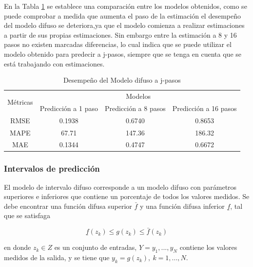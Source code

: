 \documentclass[12pt]{article}
\begin{document}
En la Tabla \ref{t_MDjp} se establece una comparación entre los modelos obtenidos, como se puede comprobar a medida que aumenta el paso de la estimación el desempeño del modelo difuso se deteriora,ya que el modelo comienza a realizar estimaciones a partir de sus propias estimaciones. Sin embargo entre la estimación a 8 y 16 pasos no existen marcadas diferencias, lo cual indica que se puede utilizar el modelo obtenido para predecir a j-pasos, siempre que se tenga en cuenta que se está trabajando con estimaciones.

\begin{table}[htbp]
  \centering
  \caption{Desempeño del Modelo difuso a j-pasos}
\begin{tabular}{|c|c|c|c|}
	\hline
	\multirow{2}{*}{Métricas} & \multicolumn{3}{c|}{Modelos}                                     \\ \cline{2-4}
	& Predicción a 1 paso & Predicción a 8 pasos & Predicción a 16 pasos \\ \hline
	RMSE                      & 0.1938              & 0.6740              & 0.8653               \\ \hline
	MAPE                      & 67.71               & 147.36              & 186.32               \\ \hline
	MAE                       & 0.1344              & 0.4747              & 0.6672               \\ \hline
\end{tabular}
  \label{t_MDjp}%
\end{table}%

\subsubsection{Intervalos de predicción}

El modelo de intervalo difuso corresponde a un modelo difuso con parámetros
superiores e inferiores que contiene un porcentaje de todos los valores medidos. Se debe encontrar una
función difusa superior $\bar{f}$ y una función difusa inferior $\underline{f}$, tal que se satisfaga


\begin{equation}
\underline{f}(z_k)\leq g(z_k)\leq \bar{f}(z_k)
\label{e_InterDif}
\end{equation}

en donde $z_k\in Z$ es un conjunto de entradas, $Y={y_1,...,y_N}$ contiene los valores medidos
de la salida, y se tiene que $y_k=g(z_k),\:k=1,...,N$.
\end{document}
